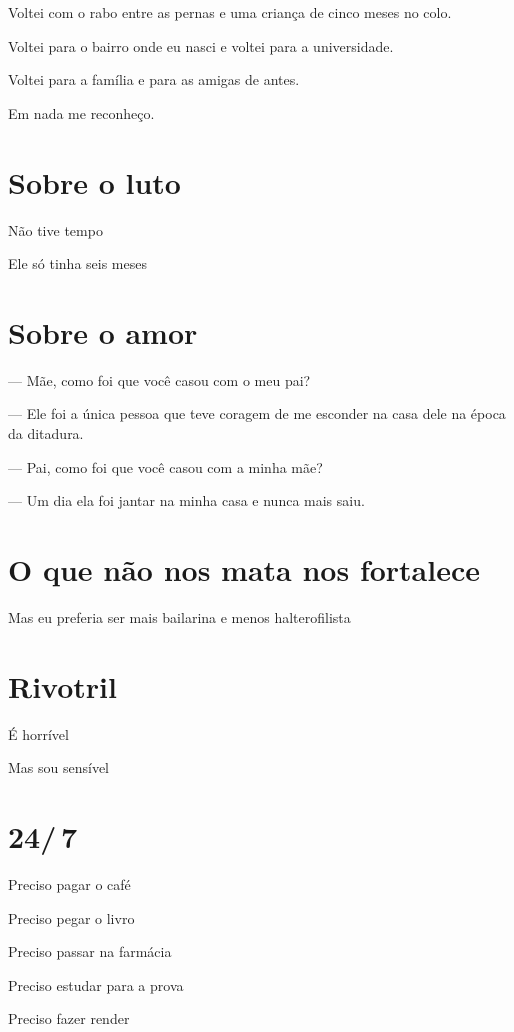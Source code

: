Voltei com o rabo entre as pernas e uma criança de cinco meses no colo.

Voltei para o bairro onde eu nasci e voltei para a universidade.

Voltei para a família e para as amigas de antes.

Em nada me reconheço.

\chapter{Sobre o luto}

{\parindent0pt\parskip1pt
Não tive tempo

Ele só tinha seis meses
}

\chapter{Sobre o amor}\label{sobre-o-amor}

--- Mãe, como foi que você casou com o meu pai?

--- Ele foi a única pessoa que teve coragem de me esconder na casa dele
na época da ditadura.\medskip

--- Pai, como foi que você casou com a minha mãe?

--- Um dia ela foi jantar na minha casa e nunca mais saiu.

\chapter{O que não nos mata nos fortalece}

Mas eu preferia ser mais bailarina e menos halterofilista


\chapter{Rivotril}

É horrível

Mas sou sensível

\chapter{24/\,7}

Preciso pagar o café

Preciso pegar o livro

Preciso passar na farmácia

Preciso estudar para a prova

Preciso fazer render

